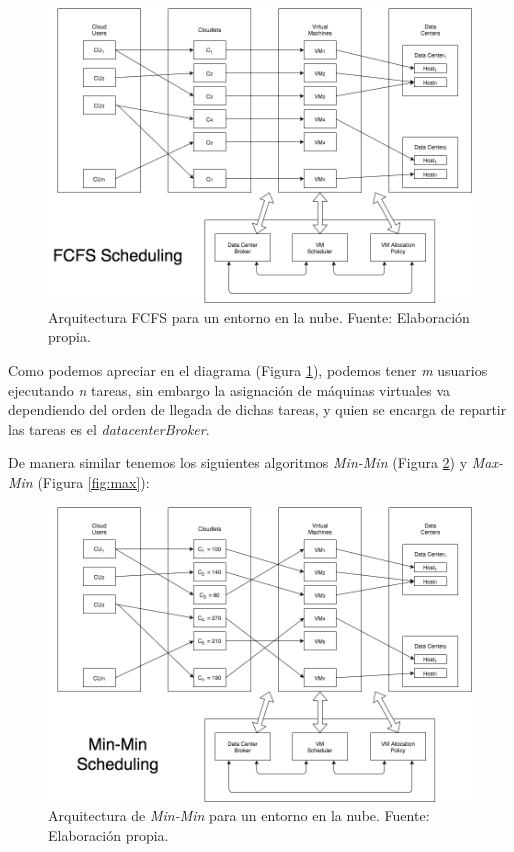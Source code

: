 \setcounter{figure}{4}
\renewcommand\thefigure{\arabic{figure}}
\begin{figure}[h!]
	\centering
	\includegraphics[scale=0.4]{media/imagentres}
	\caption{Arquitectura FCFS para un entorno en la nube. Fuente: Elaboraci\'on propia.}
	\label{fig:fcfs}
\end{figure}

Como podemos apreciar en el diagrama (Figura \ref{fig:fcfs}), podemos tener \emph{m} usuarios ejecutando \emph{n} tareas, sin embargo la asignaci\'on de m\'aquinas virtuales va dependiendo del orden de llegada de dichas tareas, y quien se encarga de repartir las tareas es el \textit{datacenterBroker}.

De manera similar tenemos los siguientes algoritmos \textit{Min-Min} (Figura \ref{fig:min}) y \textit{Max-Min} (Figura \ref{fig:max}):

\newpage

\setcounter{figure}{5}
\renewcommand\thefigure{\arabic{figure}}
\begin{figure}[h!]
	\centering
	\includegraphics[scale=0.5]{media/imagencinco}
	\caption{Arquitectura de \textit{Min-Min} para un entorno en la nube. Fuente: Elaboraci\'on propia.}
	\label{fig:min}
\end{figure}

